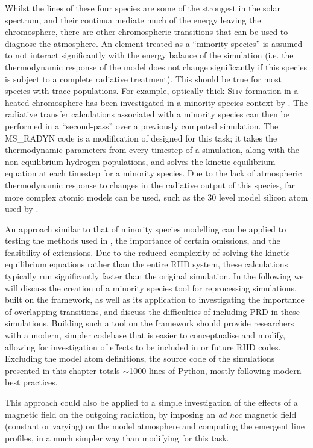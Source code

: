 Whilst the lines of these four species are some of the strongest in the solar spectrum, and their continua mediate much of the energy leaving the chromosphere, there are other chromospheric transitions that can be used to diagnose the atmosphere.
An element treated as a ``minority species'' is assumed to not interact significantly with the energy balance of the simulation (i.e. the thermodynamic response of the model does not change significantly if this species is subject to a complete radiative treatment).
This should be true for most species with trace populations.
For example, optically thick Si\,\textsc{iv} formation in a heated chromosphere has been investigated in a minority species context by \citet{Kerr2019c}.
The radiative transfer calculations associated with a minority species can then be performed in a ``second-pass'' over a previously computed \Radyn{} simulation.
The MS\_RADYN code is a modification of \Radyn{} designed for this task; it takes the thermodynamic parameters from every timestep of a \Radyn{} simulation, along with the non-equilibrium hydrogen populations, and solves the kinetic equilibrium equation at each timestep for a minority species.
Due to the lack of atmospheric thermodynamic response to changes in the radiative output of this species, far more complex atomic models can be used, such as the 30 level model silicon atom used by \citet{Kerr2019c}.

An approach similar to that of minority species modelling can be applied to testing the methods used in \Radyn{}, the importance of certain omissions, and the feasibility of extensions.
Due to the reduced complexity of solving the kinetic equilibrium equations rather than the entire RHD system, these calculations typically run significantly faster than the original simulation.
In the following we will discuss the creation of a minority species tool for reprocessing \Radyn{} simulations, built on the \Lw{} framework, as well as its application to investigating the importance of overlapping transitions, and discuss the difficulties of including PRD in these simulations.
Building such a tool on the \Lw{} framework should provide researchers with a modern, simpler codebase that is easier to conceptualise and modify, allowing for investigation of effects to be included in \Radyn{} or future RHD codes.
Excluding the model atom definitions, the source code of the simulations presented in this chapter totals $\sim$1000 lines of Python, mostly following modern best practices.

This approach could also be applied to a simple investigation of the effects of a magnetic field on the outgoing radiation, by imposing an \emph{ad hoc} magnetic field (constant or varying) on the model atmosphere and computing the emergent line profiles, in a much simpler way than modifying \Radyn{} for this task.

